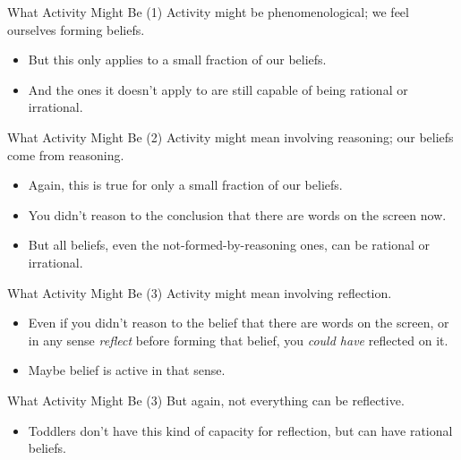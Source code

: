 \documentclass[
  17pt,
  letterpaper,
  ignorenonframetext,
  aspectratio=169,
  handout,
  xcolor={dvipsnames}]{beamer}
\providecommand{\tightlist}{%
  \setlength{\itemsep}{0pt}\setlength{\parskip}{0pt}}\usepackage{longtable,booktabs,array}
\begin{document}
\begin{frame}{What Activity Might Be (1)}
\protect\hypertarget{what-activity-might-be-1}{}
Activity might be phenomenological; we feel ourselves forming beliefs.

\begin{itemize}[<+->]
\tightlist
\item
  But this only applies to a small fraction of our beliefs.
\item
  And the ones it doesn't apply to are still capable of being rational
  or irrational.
\end{itemize}
\end{frame}

\begin{frame}{What Activity Might Be (2)}
\protect\hypertarget{what-activity-might-be-2}{}
Activity might mean involving reasoning; our beliefs come from
reasoning.

\begin{itemize}[<+->]
\tightlist
\item
  Again, this is true for only a small fraction of our beliefs.
\item
  You didn't reason to the conclusion that there are words on the screen
  now.
\item
  But all beliefs, even the not-formed-by-reasoning ones, can be
  rational or irrational.
\end{itemize}
\end{frame}

\begin{frame}{What Activity Might Be (3)}
\protect\hypertarget{what-activity-might-be-3}{}
Activity might mean involving reflection.

\begin{itemize}[<+->]
\tightlist
\item
  Even if you didn't reason to the belief that there are words on the
  screen, or in any sense \emph{reflect} before forming that belief, you
  \emph{could have} reflected on it.
\item
  Maybe belief is active in that sense.
\end{itemize}
\end{frame}

\begin{frame}{What Activity Might Be (3)}
\protect\hypertarget{what-activity-might-be-3-1}{}
But again, not everything can be reflective.

\begin{itemize}[<+->]
\tightlist
\item
  Toddlers don't have this kind of capacity for reflection, but can have
  rational beliefs.
\end{itemize}
\end{frame}
\end{document}
